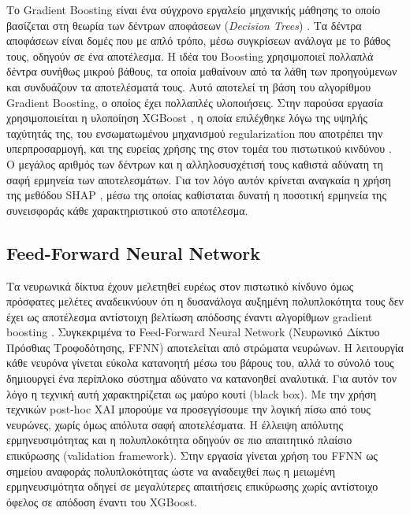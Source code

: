 Το Gradient Boosting είναι ένα σύγχρονο εργαλείο μηχανικής μάθησης 
το οποίο βασίζεται στη θεωρία των δέντρων αποφάσεων 
(\textit{Decision Trees}) \citep{hastie2009}. Τα δέντρα αποφάσεων 
είναι δομές που με απλό τρόπο, μέσω συγκρίσεων ανάλογα με το βάθος 
τους, οδηγούν σε ένα αποτέλεσμα. Η ιδέα του Boosting χρησιμοποιεί 
πολλαπλά δέντρα συνήθως μικρού βάθους, τα οποία μαθαίνουν από τα 
λάθη των προηγούμενων και συνδυάζουν τα αποτελέσματά τους. Αυτό 
αποτελεί τη βάση του αλγορίθμου Gradient Boosting, ο οποίος έχει 
πολλαπλές υλοποιήσεις. Στην παρούσα εργασία χρησιμοποιείται η 
υλοποίηση XGBoost \citep{chen2016xgboost}, η οποία επιλέχθηκε λόγω 
της υψηλής ταχύτητάς της, του ενσωματωμένου μηχανισμού regularization 
που αποτρέπει την υπερπροσαρμογή, και της ευρείας χρήσης της στον 
τομέα του πιστωτικού κινδύνου \citep{gunnarsson2021deep, bracke2019machine, lessmann2015benchmarking}. 
Ο μεγάλος αριθμός των δέντρων και η 
αλληλοσυσχέτισή τους καθιστά αδύνατη τη σαφή ερμηνεία των 
αποτελεσμάτων. Για τον λόγο αυτόν κρίνεται αναγκαία η χρήση της 
μεθόδου SHAP \citep{lundberg2017shap}, μέσω της οποίας καθίσταται 
δυνατή η ποσοτική ερμηνεία της συνεισφοράς κάθε χαρακτηριστικού 
στο αποτέλεσμα.

\subsection{Feed-Forward Neural Network}
\label{subsec:neural_network}

Τα νευρωνικά δίκτυα έχουν μελετηθεί ευρέως στον πιστωτικό κίνδυνο \citep{west2000neural}
όμως πρόσφατες μελέτες αναδεικνύουν ότι η δυσανάλογα αυξημένη πολυπλοκότητα τους 
δεν έχει ως αποτέλεσμα αντίστοιχη βελτίωση απόδοσης έναντι αλγορίθμων gradient boosting \citep{gunnarsson2021deep}.
Συγκεκριμένα το Feed-Forward Neural Network (Νευρωνικό Δίκτυο Πρόσθιας Τροφοδότησης, FFNN)
αποτελείται από στρώματα νευρώνων. Η λειτουργία κάθε νευρόνα γίνεται εύκολα
κατανοητή μέσω του βάρους του, αλλά το σύνολό τους δημιουργεί ένα περίπλοκο
σύστημα αδύνατο να κατανοηθεί αναλυτικά. Για αυτόν τον λόγο η τεχνική αυτή
χαρακτηρίζεται ως μαύρο κουτί (black box). Με την χρήση τεχνικών post-hoc XAI
μπορούμε να προσεγγίσουμε την λογική πίσω από τους νευρώνες, χωρίς όμως
απόλυτα σαφή αποτελέσματα. Η έλλειψη απόλυτης ερμηνευσιμότητας και η
πολυπλοκότητα οδηγούν σε πιο απαιτητικό πλαίσιο επικύρωσης (validation
framework). Στην εργασία γίνεται χρήση του FFNN ως σημείου αναφοράς
πολυπλοκότητας ώστε να αναδειχθεί πως η μειωμένη ερμηνευσιμότητα οδηγεί σε
μεγαλύτερες απαιτήσεις επικύρωσης χωρίς αντίστοιχο όφελος σε απόδοση
έναντι του XGBoost.



